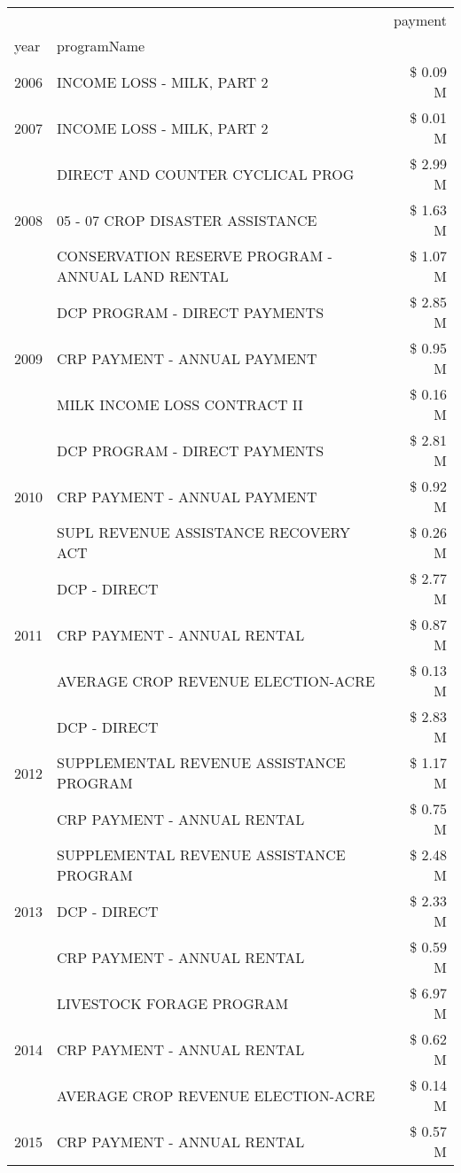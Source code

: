 \begin{tabular}{llr}
\toprule
 &  & payment \\
year & programName &  \\
\midrule
2006 & INCOME LOSS - MILK, PART 2 & \$ 0.09 M \\
\cline{1-3}
2007 & INCOME LOSS - MILK, PART 2 & \$ 0.01 M \\
\cline{1-3}
\multirow[t]{3}{*}{2008} & DIRECT AND COUNTER CYCLICAL PROG & \$ 2.99 M \\
 & 05 - 07 CROP DISASTER ASSISTANCE & \$ 1.63 M \\
 & CONSERVATION RESERVE PROGRAM - ANNUAL LAND RENTAL & \$ 1.07 M \\
\cline{1-3}
\multirow[t]{3}{*}{2009} & DCP PROGRAM - DIRECT PAYMENTS & \$ 2.85 M \\
 & CRP PAYMENT - ANNUAL PAYMENT & \$ 0.95 M \\
 & MILK INCOME LOSS CONTRACT II & \$ 0.16 M \\
\cline{1-3}
\multirow[t]{3}{*}{2010} & DCP PROGRAM - DIRECT PAYMENTS & \$ 2.81 M \\
 & CRP PAYMENT - ANNUAL PAYMENT & \$ 0.92 M \\
 & SUPL REVENUE ASSISTANCE RECOVERY ACT & \$ 0.26 M \\
\cline{1-3}
\multirow[t]{3}{*}{2011} & DCP - DIRECT & \$ 2.77 M \\
 & CRP PAYMENT - ANNUAL RENTAL & \$ 0.87 M \\
 & AVERAGE CROP REVENUE ELECTION-ACRE & \$ 0.13 M \\
\cline{1-3}
\multirow[t]{3}{*}{2012} & DCP - DIRECT & \$ 2.83 M \\
 & SUPPLEMENTAL REVENUE ASSISTANCE PROGRAM & \$ 1.17 M \\
 & CRP PAYMENT - ANNUAL RENTAL & \$ 0.75 M \\
\cline{1-3}
\multirow[t]{3}{*}{2013} & SUPPLEMENTAL REVENUE ASSISTANCE PROGRAM & \$ 2.48 M \\
 & DCP - DIRECT & \$ 2.33 M \\
 & CRP PAYMENT - ANNUAL RENTAL & \$ 0.59 M \\
\cline{1-3}
\multirow[t]{3}{*}{2014} & LIVESTOCK FORAGE PROGRAM & \$ 6.97 M \\
 & CRP PAYMENT - ANNUAL RENTAL & \$ 0.62 M \\
 & AVERAGE CROP REVENUE ELECTION-ACRE & \$ 0.14 M \\
\cline{1-3}
\multirow[t]{3}{*}{2015} & CRP PAYMENT - ANNUAL RENTAL & \$ 0.57 M \\

\end{tabular}
